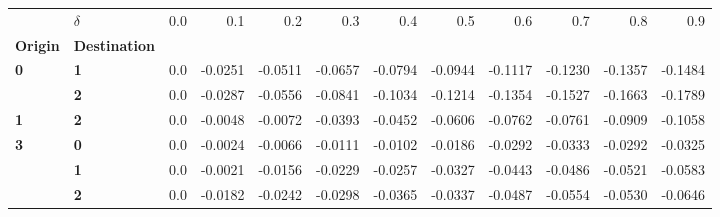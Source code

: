 \begin{tabular}{llrrrrrrrrrr}
\toprule
    & \textbf{\(\delta\)} &  0.0 &     0.1 &     0.2 &     0.3 &     0.4 &     0.5 &     0.6 &     0.7 &     0.8 &     0.9 \\
\textbf{Origin} & \textbf{Destination} &      &         &         &         &         &         &         &         &         &         \\
\midrule
\textbf{0} & \textbf{1} &  0.0 & -0.0251 & -0.0511 & -0.0657 & -0.0794 & -0.0944 & -0.1117 & -0.1230 & -0.1357 & -0.1484 \\
  & \textbf{2} &  0.0 & -0.0287 & -0.0556 & -0.0841 & -0.1034 & -0.1214 & -0.1354 & -0.1527 & -0.1663 & -0.1789 \\
\textbf{1} & \textbf{2} &  0.0 & -0.0048 & -0.0072 & -0.0393 & -0.0452 & -0.0606 & -0.0762 & -0.0761 & -0.0909 & -0.1058 \\
\textbf{3} & \textbf{0} &  0.0 & -0.0024 & -0.0066 & -0.0111 & -0.0102 & -0.0186 & -0.0292 & -0.0333 & -0.0292 & -0.0325 \\
  & \textbf{1} &  0.0 & -0.0021 & -0.0156 & -0.0229 & -0.0257 & -0.0327 & -0.0443 & -0.0486 & -0.0521 & -0.0583 \\
  & \textbf{2} &  0.0 & -0.0182 & -0.0242 & -0.0298 & -0.0365 & -0.0337 & -0.0487 & -0.0554 & -0.0530 & -0.0646 \\
\bottomrule
\end{tabular}
